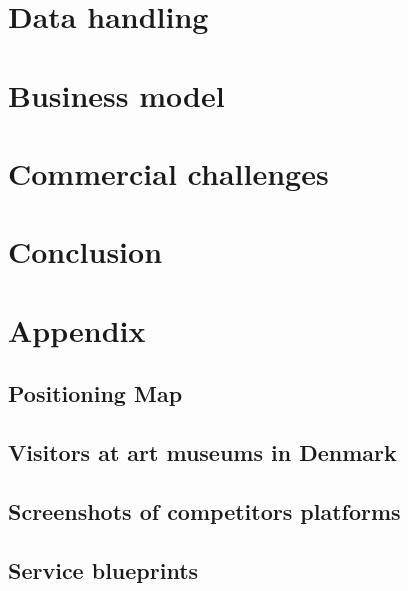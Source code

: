 \documentclass[a4paper,11pt,fleqn,dvipsnames,oneside,openright]{memoir}
\begin{document}
\chapter{Data handling}


\chapter{Business model}


\chapter{Commercial challenges}


\chapter{Conclusion}


\begingroup
	\raggedright
	\printbibliography
\endgroup 

\appendix

\chapter{Appendix}

\section{Positioning Map}
\label{PositioningMap}

\newpage

\section{Visitors at art museums in Denmark}
\label{Visitors}

\newpage

\section{Screenshots of competitors platforms}
\label{CompetitorsPlatforms}

\newpage

\section{Service blueprints}
\label{ServiceBlueprint}

\end{document}
